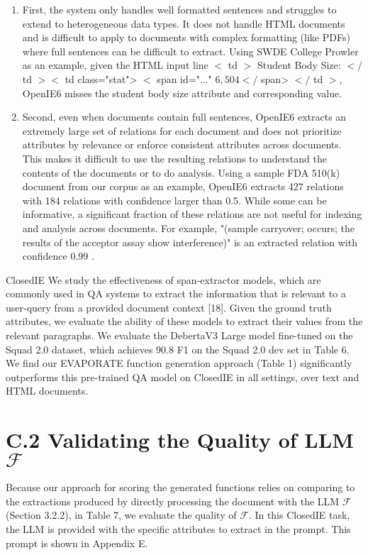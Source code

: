 \documentclass[10pt]{article}
\begin{document}
\begin{enumerate}
  \item First, the system only handles well formatted sentences and struggles to extend to heterogeneous data types. It does not handle HTML documents and is difficult to apply to documents with complex formatting (like PDFs) where full sentences can be difficult to extract. Using SWDE College Prowler as an example, given the HTML input line $<$ td $>$ Student Body Size: $</$ td $><$ td class="stat"> $<$ span id="..." $6,504</$ span> $</$ td $>$, OpenIE6 misses the student body size attribute and corresponding value.

  \item Second, even when documents contain full sentences, OpenIE6 extracts an extremely large set of relations for each document and does not prioritize attributes by relevance or enforce consistent attributes across documents. This makes it difficult to use the resulting relations to understand the contents of the documents or to do analysis. Using a sample FDA 510(k) document from our corpus as an example, OpenIE6 extracts 427 relations with 184 relations with confidence larger than 0.5. While some can be informative, a significant fraction of these relations are not useful for indexing and analysis across documents. For example, "(sample carryover; occurs; the results of the acceptor assay show interference)" is an extracted relation with confidence 0.99 .

\end{enumerate}

ClosedIE We study the effectiveness of span-extractor models, which are commonly used in QA systems to extract the information that is relevant to a user-query from a provided document context [18]. Given the ground truth attributes, we evaluate the ability of these models to extract their values from the relevant paragraphs. We evaluate the DebertaV3 Large model fine-tuned on the Squad 2.0 dataset, which achieves 90.8 F1 on the Squad 2.0 dev set in Table 6. We find our EVAPORATE function generation approach (Table 1) significantly outperforms this pre-trained QA model on ClosedIE in all settings, over text and HTML documents.

\section{C.2 Validating the Quality of LLM $\mathcal{F}$}
Because our approach for scoring the generated functions relies on comparing to the extractions produced by directly processing the document with the LLM $\mathcal{F}$ (Section 3.2.2), in Table 7, we evaluate the quality of $\mathcal{F}$. In this ClosedIE task, the LLM is provided with the specific attributes to extract in the prompt. This prompt is shown in Appendix E.
\end{document}
